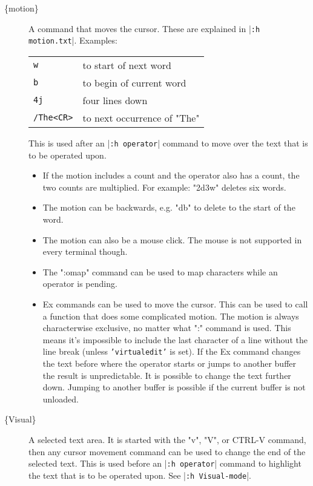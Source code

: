 \begin{description}
				\item[\{motion\}]
								\label{{motion}}
								\label{movement}
								A command that moves the cursor.
								These are explained in |\texttt{:h motion.txt}|.
								Examples:
								\begin{center} \begin{tabular}{l l}
																\texttt{w} & to start of next word\\
																\texttt{b} & to begin of current word\\
																\texttt{4j} & four lines down\\
												\texttt{/The<CR>} & to next occurrence of "The"\\
												\end{tabular}
								\end{center}
								This is used after an |\texttt{:h operator}| command to move over the text that is to be operated upon.
								\begin{itemize}
												\item If the motion includes a count and the operator also has a count, the two counts are multiplied.
																For example: "2d3w" deletes six words.
												\item The motion can be backwards, e.g. "db" to delete to the start of the word.
												\item The motion can also be a mouse click.
																The mouse is not supported in every terminal though.
												\item The ":omap" command can be used to map characters while an operator is pending.
												\item Ex commands can be used to move the cursor.
																This can be used to call a function that does some complicated motion.
																The motion is always characterwise exclusive, no matter what ":" command is used.
																This means it's impossible to include the last character of a line without the line break (unless \texttt{'virtualedit'} is set).
																If the Ex command changes the text before where the operator starts or jumps to another buffer the result is unpredictable.
																It is possible to change the text further down.
																Jumping to another buffer is possible if the current buffer is not unloaded.
								\end{itemize}

				\item[\{Visual\}]
								\label{{Visual}}
								A selected text area.
								It is started with the "v", "V", or CTRL-V command, then any cursor movement command can be used to change the end of the selected text.
								This is used before an |\texttt{:h operator}| command to highlight the text that is to be operated upon.
								See |\texttt{:h Visual-mode}|.


\end{description}
